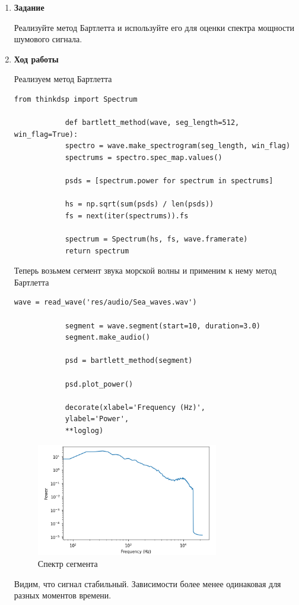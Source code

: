 \documentclass[a4paper,12pt]{article}
\begin{document}
	\begin{enumerate}
		
		\item \textbf{Задание}
		
		Реализуйте метод Бартлетта и используйте его для оценки спектра мощности шумового сигнала.
		
		\item \textbf{Ход работы}
		
		Реализуем метод Бартлетта
		\begin{lstlisting}[caption=Метод Бартлетта]
			from thinkdsp import Spectrum
			
			def bartlett_method(wave, seg_length=512, win_flag=True):
			spectro = wave.make_spectrogram(seg_length, win_flag)
			spectrums = spectro.spec_map.values()
			
			psds = [spectrum.power for spectrum in spectrums]
			
			hs = np.sqrt(sum(psds) / len(psds))
			fs = next(iter(spectrums)).fs
			
			spectrum = Spectrum(hs, fs, wave.framerate)
			return spectrum
		\end{lstlisting}
	
		Теперь возьмем сегмент звука морской волны и применим к нему метод Бартлетта
		
		\begin{lstlisting}[caption=Применение метода Бартлетта]
			wave = read_wave('res/audio/Sea_waves.wav')
			
			segment = wave.segment(start=10, duration=3.0)
			segment.make_audio()
			
			psd = bartlett_method(segment)
			
			psd.plot_power()
			
			decorate(xlabel='Frequency (Hz)', 
			ylabel='Power', 
			**loglog)
		\end{lstlisting}
		\begin{figure}[H]
			\centering
			\includegraphics[width=0.75\textwidth]{2_1.png}
			\caption{Спектр сегмента}
			\label{fig:2.1}
		\end{figure}
			
		Видим, что сигнал стабильный. Зависимости более менее одинаковая для разных моментов времени.
		
	\end{enumerate}
	\newpage
	
\end{document}
